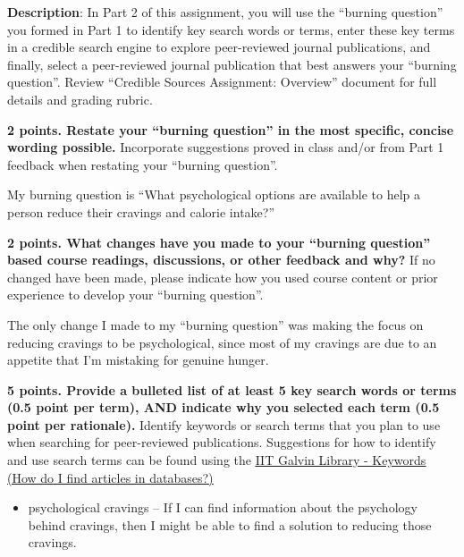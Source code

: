 \documentclass[title={Credible Sources - Literature Review and Article Selection},points={30}]{fdsn201homework}
\let\oldhref\href
\renewcommand{\href}[2]{\oldhref{#1}{\underline{#2}}}
\begin{document}
\maketitle

\noindent%
\textbf{Description}: In Part 2 of this assignment, you will use the ``burning question'' you formed in Part 1 to identify key search words or terms, enter these key terms in a credible search engine to explore peer-reviewed journal publications, and finally, select a peer-reviewed journal publication that best answers your ``burning question''.
Review ``Credible Sources Assignment: Overview'' document for full details and grading rubric.

\begin{problems}
	\item \textbf{2 points. Restate your ``burning question'' in the most specific, concise wording possible.}
	Incorporate suggestions proved in class and/or from Part 1 feedback when restating your ``burning question''.%
	\begin{answer}%
		My burning question is ``What psychological options are available to help a person reduce their cravings and calorie intake?''
	\end{answer}
	\item \textbf{2 points. What changes have you made to your ``burning question'' based course readings, discussions, or other feedback and why?}
	If no changed have been made, please indicate how you used course content or prior experience to develop your ``burning question''.%
	\begin{answer}%
		The only change I made to my ``burning question'' was making the focus on reducing cravings to be psychological, since most of my cravings are due to an appetite that I'm mistaking for genuine hunger.
	\end{answer}
	\item \textbf{5 points. Provide a bulleted list of at least 5 key search words or terms (0.5 point per term), AND indicate why you selected each term (0.5 point per rationale).}
	Identify keywords or search terms that you plan to use when searching for peer-reviewed publications.
	Suggestions for how to identify and use search terms can be found using the \href{https://iit.libanswers.com/faq/292350}{IIT Galvin Library - Keywords (How do I find articles in databases?)}%
	\begin{answer}%
		\begin{itemize}
			\item psychological cravings -- If I can find information about the psychology behind cravings, then I might be able to find a solution to reducing those cravings.

\end{itemize}
\end{answer}
\end{problems}
\end{document}
